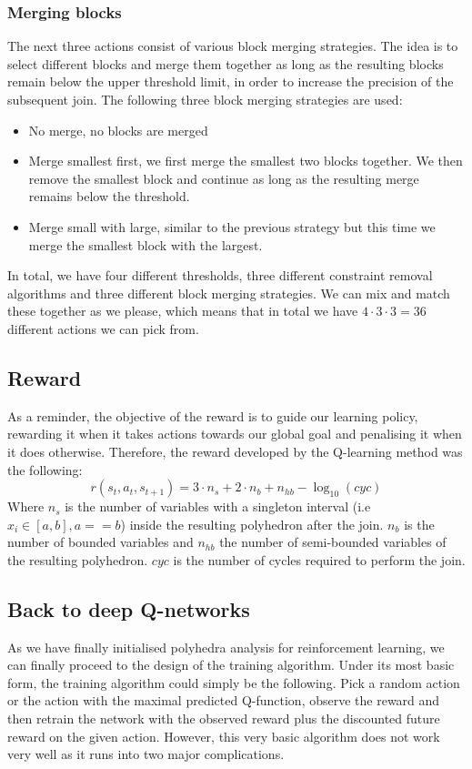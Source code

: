 \subsubsection{Merging blocks}
The next three actions consist of various block merging strategies. The idea is to select different blocks and merge them together as long as the resulting blocks remain below the upper threshold limit, in order to increase the precision of the subsequent join. The following three block merging strategies are used:
\begin{itemize}
    \item No merge, no blocks are merged
    \item Merge smallest first, we first merge the smallest two blocks together. We then remove the smallest block and continue as long as the resulting merge remains below the threshold.
    \item Merge small with large, similar to the previous strategy but this time we merge the smallest block with the largest.
\end{itemize}

In total, we have four different thresholds, three different constraint removal algorithms and three different block merging strategies. We can mix and match these together as we please, which means that in total we have $4\cdot 3\cdot 3 =36$ different actions we can pick from.

\subsection{Reward}
As a reminder, the objective of the reward is to guide our learning policy, rewarding it when it takes actions towards our global goal and penalising it when it does otherwise. Therefore, the reward developed by the Q-learning method was the following:
\begin{equation}
    r(s_t,a_t,s_{t+1}) = 3  \cdot n_s + 2 \cdot n_b + n_{hb} - \log_{10}(cyc)
\end{equation}
Where $n_s$ is the number of variables with a singleton interval (i.e $x_i \in [a,b], a==b$) inside the resulting polyhedron after the join. $n_b$ is the number of bounded variables and $n_{hb}$ the number of semi-bounded variables of the resulting polyhedron. $cyc$ is the number of cycles required to perform the join.
\subsection{Back to deep Q-networks}
As we have finally initialised polyhedra analysis for reinforcement learning, we can finally proceed to the design of the training algorithm. Under its most basic form, the training algorithm could simply be the following. Pick a random action or the action with the maximal predicted Q-function, observe the reward and then retrain the network with the observed reward plus the discounted future reward on the given action. However, this very basic algorithm does not work very well as it runs into two major complications.

